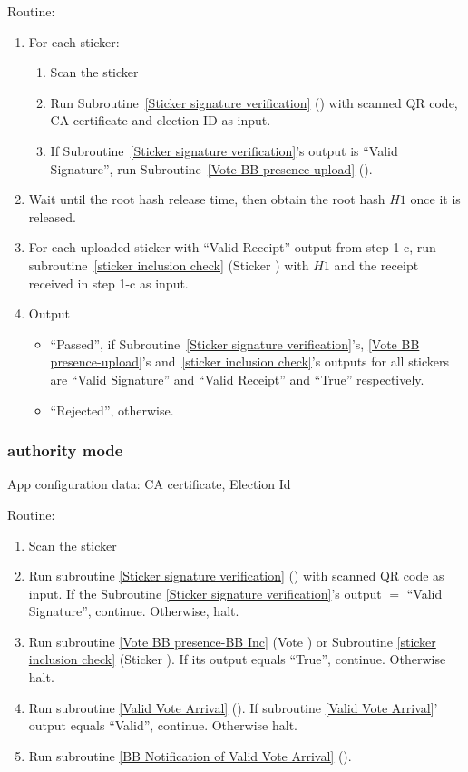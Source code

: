\documentclass{article}
\begin{document}
Routine:
\begin{enumerate}
    \item For each sticker:
    \begin{enumerate}
        \item Scan the sticker
        \item Run Subroutine~\ref{Sticker signature verification} (\StickersignatureVerification{}) with scanned QR code, CA certificate and election ID as input.
        \item If Subroutine~\ref{Sticker signature verification}'s output is ``Valid Signature'', run Subroutine~\ref{Vote BB presence-upload} (\StickerBBUpload{}).
    \end{enumerate}
    \item Wait until the root hash release time, then obtain the root hash $H1$ once it is released.
    \item For each uploaded sticker with ``Valid Receipt'' output from step 1-c, run subroutine~\ref{sticker inclusion check} (Sticker \BBInclusionCheck{}) with  $H1$ and the receipt received in step 1-c as input.
    \item Output
    \begin{itemize}
        \item ``Passed'',  if Subroutine~\ref{Sticker signature verification}'s, \ref{Vote BB presence-upload}'s and~\ref{sticker inclusion check}'s outputs for all stickers are ``Valid Signature'' and ``Valid Receipt'' and ``True'' respectively.
        \item ``Rejected'', otherwise.
    \end{itemize}
\end{enumerate}




\subsubsection{\localVotingCenter{} authority mode}
App configuration data: CA certificate, Election Id

Routine:
\begin{enumerate}
    \item Scan the sticker
    \item Run subroutine \ref{Sticker signature verification} (\StickersignatureVerification{}) with scanned QR code as input. If the Subroutine \ref{Sticker signature verification}'s output $=$ ``Valid Signature'', continue. Otherwise, halt.
    \item Run subroutine \ref{Vote BB presence-BB Inc} (Vote \BBInclusionCheck{}) or Subroutine \ref{sticker inclusion check} (Sticker \BBInclusionCheck{}). If its output equals ``True'', continue. Otherwise halt.
    \item Run subroutine \ref{Valid Vote Arrival} (\ValidVoteArrival{}). If subroutine \ref{Valid Vote Arrival}' output equals ``Valid'', continue. Otherwise halt.
    \item Run subroutine \ref{BB Notification of Valid Vote Arrival} (\ArrivalBBNotification{}).
\end{enumerate}
\end{document}
